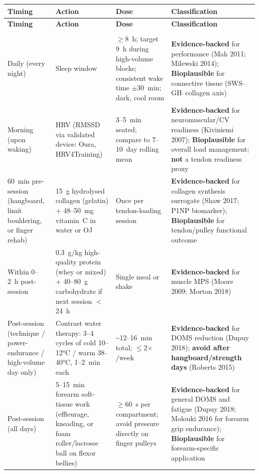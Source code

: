 \begin{center}
\small
\begin{longtable}{>{\raggedright}p{3.2cm} >{\raggedright}p{3.5cm} >{\raggedright}p{3.0cm} >{\raggedright\arraybackslash}p{5.5cm}}
\toprule
\textbf{Timing} & \textbf{Action} & \textbf{Dose} & \textbf{Classification} \\
\midrule
\endfirsthead
\toprule
\textbf{Timing} & \textbf{Action} & \textbf{Dose} & \textbf{Classification} \\
\midrule
\endhead
\midrule
\multicolumn{4}{r}{\footnotesize\textit{Continued on next page}}\\
\endfoot
\bottomrule
\endlastfoot

Daily (every night) & Sleep window & $\geq$8~h; target 9~h during high-volume blocks; consistent wake time $\pm$30~min; dark, cool room & \textbf{Evidence-backed} for performance (Mah 2011; Milewski 2014); \textbf{Bioplausible} for connective tissue (SWS--GH--collagen axis) \\

Morning (upon waking) & HRV (RMSSD via validated device: Oura, HRV4Training) & 3--5~min seated; compare to 7--10~day rolling mean & \textbf{Evidence-backed} for neuromuscular/CV readiness (Kiviniemi 2007); \textbf{Bioplausible} for overall load management; \textbf{not} a tendon readiness proxy \\

60~min pre-session (hangboard, limit bouldering, or finger rehab) & 15~g hydrolysed collagen (gelatin) + 48--50~mg vitamin~C in water or OJ & Once per tendon-loading session & \textbf{Evidence-backed} for collagen synthesis surrogate (Shaw 2017; P1NP biomarker); \textbf{Bioplausible} for tendon/pulley functional outcome \\

Within 0--2~h post-session & 0.3~g/kg high-quality protein (whey or mixed) + 40--80~g carbohydrate if next session $<$24~h & Single meal or shake & \textbf{Evidence-backed} for muscle MPS (Moore 2009; Morton 2018) \\

Post-session (technique / power-endurance / high-volume day only) & Contrast water therapy: 3--4 cycles of cold 10--12°C / warm 38--40°C, 1--2~min each & \textasciitilde{}12--16~min total; $\leq$2$\times$/week & \textbf{Evidence-backed} for DOMS reduction (Dupuy 2018); \textbf{avoid after hangboard/strength days} (Roberts 2015) \\

Post-session (all days) & 5--15~min forearm soft-tissue work (effleurage, kneading, or foam roller/lacrosse ball on flexor bellies) & $\geq$60~s per compartment; avoid pressure directly on finger pulleys & \textbf{Evidence-backed} for general DOMS and fatigue (Dupuy 2018; Molouki 2016 for forearm grip endurance); \textbf{Bioplausible} for forearm-specific application \\


\end{longtable}
\end{center}
